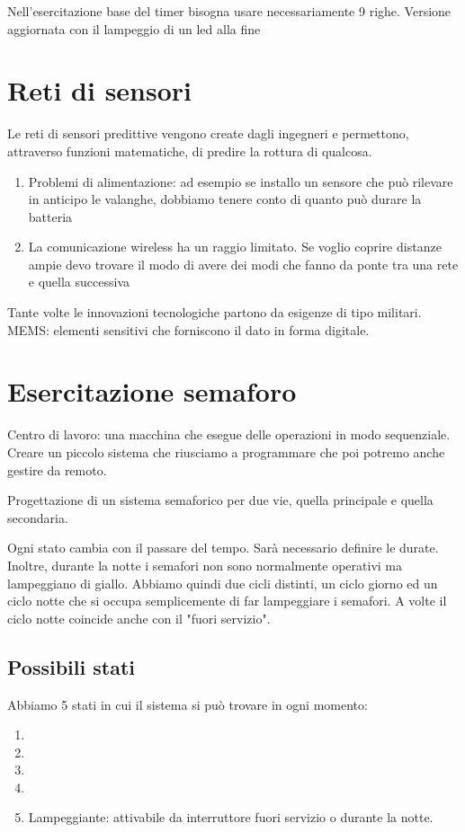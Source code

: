 \documentclass{article}
\begin{document}
    Nell'esercitazione base del timer bisogna usare necessariamente 9 righe.\newline
    Versione aggiornata con il lampeggio di un led alla fine

    \section{Reti di sensori}

    Le reti di sensori predittive vengono create dagli ingegneri e permettono, attraverso funzioni matematiche, di predire la rottura di qualcosa.

    \begin{enumerate}
        \item Problemi di alimentazione: ad esempio se installo un sensore che può rilevare in anticipo le valanghe, dobbiamo tenere conto di quanto può durare la batteria
        \item La comunicazione wireless ha un raggio limitato. Se voglio coprire distanze ampie devo trovare il modo di avere dei modi che fanno da ponte tra una rete e quella successiva
    \end{enumerate}

    Tante volte le innovazioni tecnologiche partono da esigenze di tipo militari.
    MEMS: elementi sensitivi che forniscono il dato in forma digitale.

    \section{Esercitazione semaforo}

    Centro di lavoro: una macchina che esegue delle operazioni in modo sequenziale. Creare un piccolo sistema che riusciamo a programmare che poi potremo anche gestire da remoto.

    Progettazione di un sistema semaforico per due vie, quella principale e quella secondaria.

    Ogni stato cambia con il passare del tempo. Sarà necessario definire le durate.
    Inoltre, durante la notte i semafori non sono normalmente operativi ma lampeggiano di giallo. Abbiamo quindi due cicli distinti, un ciclo giorno ed un ciclo notte che si occupa semplicemente di far lampeggiare i semafori. A volte il ciclo notte coincide anche con il "fuori servizio".

    \vspace{1cm}
    
    \subsection{Possibili stati}
    Abbiamo 5 stati in cui il sistema si può trovare in ogni momento:
    \begin{enumerate}
        \item 
        \item 
        \item 
        \item 
        \item Lampeggiante: attivabile da interruttore fuori servizio o durante la notte.
    \end{enumerate}
\end{document}
